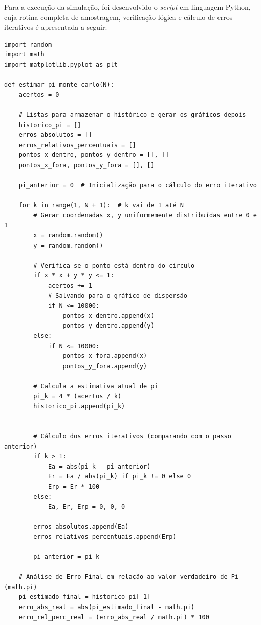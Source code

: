 
Para a execução da simulação, foi desenvolvido o \textit{script} em linguagem Python, cuja rotina completa de amostragem, verificação lógica e cálculo de erros iterativos é apresentada a seguir:

\begin{verbatim}
import random
import math
import matplotlib.pyplot as plt

def estimar_pi_monte_carlo(N):
    acertos = 0

    # Listas para armazenar o histórico e gerar os gráficos depois
    historico_pi = []
    erros_absolutos = []
    erros_relativos_percentuais = []
    pontos_x_dentro, pontos_y_dentro = [], []
    pontos_x_fora, pontos_y_fora = [], []

    pi_anterior = 0  # Inicialização para o cálculo do erro iterativo

    for k in range(1, N + 1):  # k vai de 1 até N
        # Gerar coordenadas x, y uniformemente distribuídas entre 0 e 1 
        x = random.random()
        y = random.random()

        # Verifica se o ponto está dentro do círculo
        if x * x + y * y <= 1:
            acertos += 1
            # Salvando para o gráfico de dispersão 
            if N <= 10000:
                pontos_x_dentro.append(x)
                pontos_y_dentro.append(y)
        else:
            if N <= 10000:
                pontos_x_fora.append(x)
                pontos_y_fora.append(y)

        # Calcula a estimativa atual de pi
        pi_k = 4 * (acertos / k)
        historico_pi.append(pi_k)
        
        
        # Cálculo dos erros iterativos (comparando com o passo anterior)
        if k > 1:
            Ea = abs(pi_k - pi_anterior)
            Er = Ea / abs(pi_k) if pi_k != 0 else 0
            Erp = Er * 100
        else:
            Ea, Er, Erp = 0, 0, 0

        erros_absolutos.append(Ea)
        erros_relativos_percentuais.append(Erp)

        pi_anterior = pi_k

    # Análise de Erro Final em relação ao valor verdadeiro de Pi (math.pi)
    pi_estimado_final = historico_pi[-1]
    erro_abs_real = abs(pi_estimado_final - math.pi)
    erro_rel_perc_real = (erro_abs_real / math.pi) * 100


\end{verbatim}
